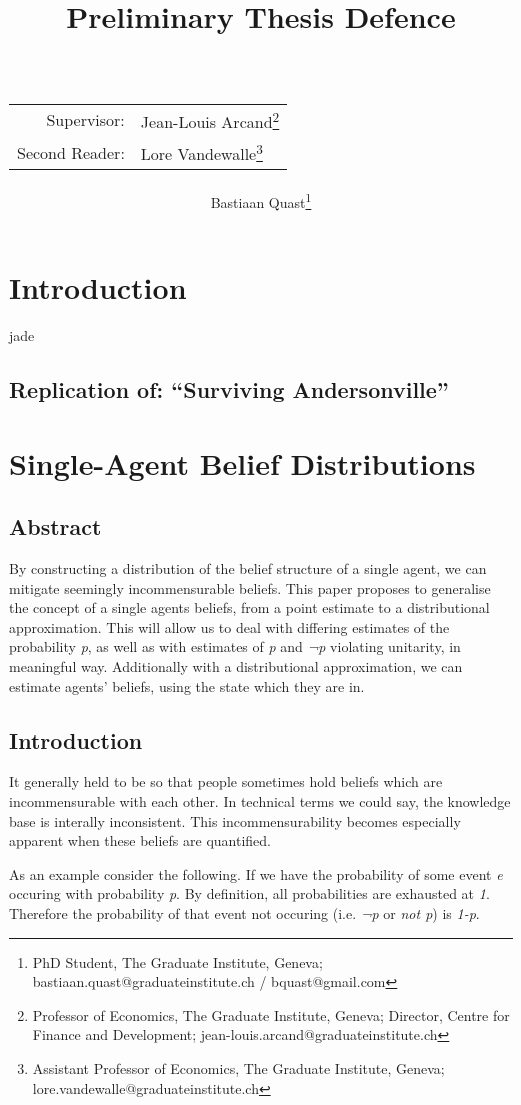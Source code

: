 \documentclass[a4paper]{book}\usepackage{graphicx, color}
\title{Preliminary Thesis Defence\\~\\
\begin{tabular}{rl}
Supervisor:&Jean-Louis Arcand\footnote{Professor of Economics, The Graduate Institute, Geneva; Director, Centre for Finance and Development; jean-louis.arcand@graduateinstitute.ch}\\
Second Reader:&Lore Vandewalle\footnote{Assistant Professor of Economics, The Graduate Institute, Geneva; lore.vandewalle@graduateinstitute.ch}
\end{tabular}
}
\author{Bastiaan Quast\thanks{PhD Student, The Graduate Institute, Geneva; bastiaan.quast@graduateinstitute.ch / bquast@gmail.com}}
\begin{document}
\frontmatter
\maketitle
\tableofcontents

\chapter{Introduction}
jade

\mainmatter



\begin{refsection}
\chapter{Replication of: ``Surviving Andersonville''}

\printbibliography
\end{refsection}

\chapter{Single-Agent Belief Distributions}

\section*{Abstract}
By constructing a distribution of the belief structure of a single
agent, we can mitigate seemingly incommensurable beliefs. This paper
proposes to generalise the concept of a single agents beliefs, from a
point estimate to a distributional approximation. This will allow us to
deal with differing estimates of the probability \emph{p}, as well as
with estimates of \emph{p} and \emph{¬p} violating unitarity, in
meaningful way. Additionally with a distributional approximation, we can
estimate agents' beliefs, using the state which they are in.

\section{Introduction}

It generally held to be so that people sometimes hold beliefs which are
incommensurable with each other. In technical terms we could say, the
knowledge base is interally inconsistent. This incommensurability
becomes especially apparent when these beliefs are quantified.

As an example consider the following. If we have the probability of some
event \emph{e} occuring with probability \emph{p}. By definition, all
probabilities are exhausted at \emph{1}. Therefore the probability of
that event not occuring (i.e. \emph{¬p} or \emph{not p}) is \emph{1-p}.
\end{document}
